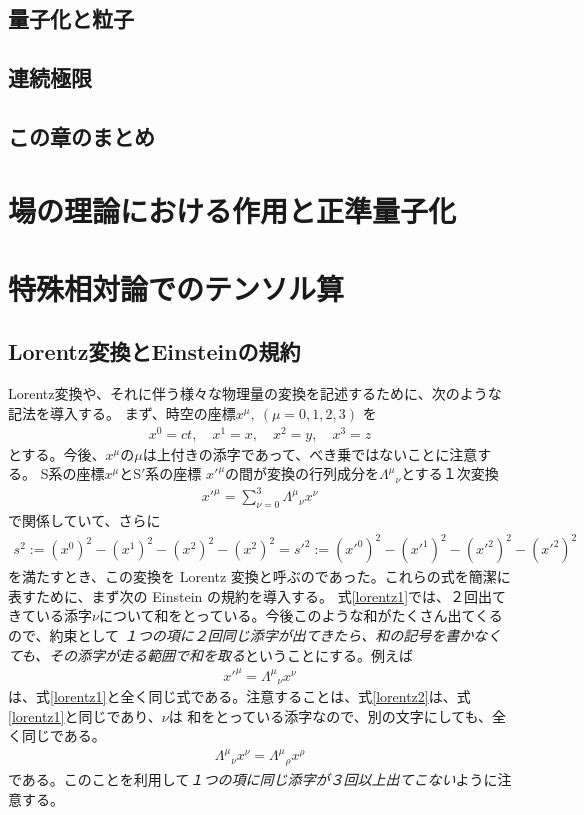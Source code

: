 \documentclass[report,paper=a4, fontsize=12pt, line_length=16cm, number_of_lines=33,dvipdfmx]{jlreq}
\numberwithin{equation}{chapter}
\newcommand{\Sp}{S$'$}
\begin{document}
\section{量子化と粒子}
\section{連続極限}
\section{この章のまとめ}



\chapter{場の理論における作用と正準量子化}


\appendix
\chapter{特殊相対論でのテンソル算}
\label{app:tensor}
\section{Lorentz変換とEinsteinの規約}
Lorentz変換や、それに伴う様々な物理量の変換を記述するために、次のような記法を導入する。
まず、時空の座標$x^{\mu},\ (\mu=0,1,2,3)$ を
\begin{align}
x^{0}=ct,\quad x^{1}=x,\quad x^{2}=y,\quad x^{3}=z
\end{align}
とする。今後、$x^{\mu}$の$\mu$は上付きの添字であって、べき乗ではないことに注意する。
S系の座標$x^{\mu}$と\Sp 系の座標 $x'^{\mu}$の間が変換の行列成分を$\Lambda^{\mu}{}_{\nu}$とする１次変換
\begin{align}
 x'^{\mu}=\sum_{\nu=0}^{3}\Lambda^{\mu}{}_{\nu}x^{\nu}
\label{lorentz1}
\end{align}
で関係していて、さらに
\begin{align}
s^{2}
:=(x^{0})^{2}-(x^{1})^{2}-(x^{2})^{2}-(x^{2})^{2}
=s'^{2}
:=(x'^{0})^{2}-(x'^{1})^{2}-(x'^{2})^{2}-(x'^{2})^{2}
\end{align}
を満たすとき、この変換を Lorentz 変換と呼ぶのであった。これらの式を簡潔に表すために、まず次の Einstein の規約を導入する。
式\eqref{lorentz1}では、２回出てきている添字$\nu$について和をとっている。今後このような和がたくさん出てくるので、約束として
\emph{１つの項に２回同じ添字が出てきたら、和の記号を書かなくても、その添字が走る範囲で和を取る}ということにする。例えば
\begin{align}
 x'^{\mu}=\Lambda^{\mu}{}_{\nu}x^{\nu}
\label{lorentz2}
\end{align}
は、式\eqref{lorentz1}と全く同じ式である。注意することは、式\eqref{lorentz2}は、式\eqref{lorentz1}と同じであり、$\nu$は
和をとっている添字なので、別の文字にしても、全く同じである。
\begin{align}
\Lambda^{\mu}{}_{\nu}x^{\nu}
=\Lambda^{\mu}{}_{\rho}x^{\rho}
\end{align}
である。このことを利用して\emph{１つの項に同じ添字が３回以上出てこない}ように注意する。
\end{document}
